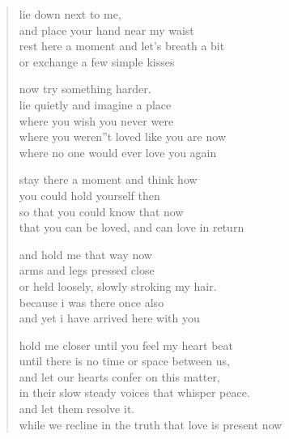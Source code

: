 \begin{verse}
lie down next to me,\\
and place your hand near my waist \\
rest here a moment and let's breath a bit \\
or exchange a few simple kisses 

now try something harder. \\
lie quietly and imagine a place \\
where you wish you never were \\
where you weren''t loved like you are now \\
where no one would ever love you again 

stay there a moment and think how \\
you could hold yourself then \\
so that you could know that now \\
that you can be loved, and can love in return 

and hold me that way now \\
arms and legs pressed close \\
or held loosely, slowly stroking my hair. \\
because i was there once also \\
and yet i have arrived here with you

hold me closer until you feel my heart beat \\
until there is no time or space between us, \\
and let our hearts confer on this matter, \\
in their slow steady voices that whisper peace. \\
and let them resolve it. \\
while we recline in the truth that love is present now
\end{verse}
